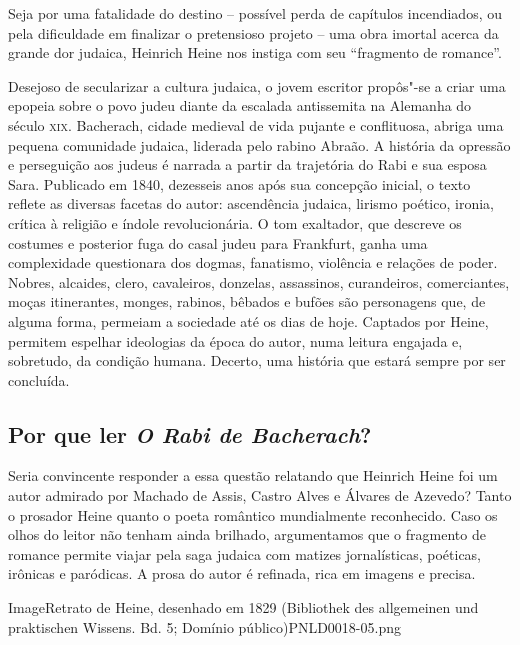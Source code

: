 \documentclass[12pt]{extarticle}
\begin{document}
Seja por uma fatalidade do destino -- possível perda de capítulos
incendiados, ou pela dificuldade em finalizar o pretensioso projeto --
uma obra imortal acerca da grande dor judaica, Heinrich Heine nos
instiga com seu ``fragmento de romance''. 


Desejoso de secularizar a cultura judaica, o jovem escritor propôs"-se a criar uma epopeia sobre o
povo judeu diante da escalada antissemita na Alemanha do século \textsc{xix}.
Bacherach, cidade medieval de vida pujante e conflituosa, abriga uma
pequena comunidade judaica, liderada pelo rabino Abraão. A história da
opressão e perseguição aos judeus é narrada a partir da trajetória do
Rabi e sua esposa Sara. Publicado em 1840, dezesseis anos após sua
concepção inicial, o texto reflete as diversas facetas do autor:
ascendência judaica, lirismo poético, ironia, crítica à religião e
índole revolucionária. O tom exaltador, que descreve os costumes e
posterior fuga do casal judeu para Frankfurt, ganha uma complexidade
questionara dos dogmas, fanatismo, violência e relações de poder.
Nobres, alcaides, clero, cavaleiros, donzelas, assassinos, curandeiros,
comerciantes, moças itinerantes, monges, rabinos, bêbados e bufões são
personagens que, de alguma forma, permeiam a sociedade até os dias de
hoje. Captados por Heine, permitem espelhar ideologias da época do
autor, numa leitura engajada e, sobretudo, da condição humana. Decerto,
uma história que estará sempre por ser concluída.

\subsection{Por que ler \textit{O Rabi de Bacherach}?}

Seria convincente responder a essa questão relatando que Heinrich Heine
foi um autor admirado por Machado de Assis, Castro Alves e Álvares de
Azevedo? Tanto o prosador Heine quanto o poeta romântico mundialmente
reconhecido. Caso os olhos do leitor não tenham ainda brilhado,
argumentamos que o fragmento de romance permite viajar pela saga judaica
com matizes jornalísticas, poéticas, irônicas e paródicas. A prosa do
autor é refinada, rica em imagens e precisa.


Image{Retrato de Heine, desenhado em 1829 (Bibliothek des allgemeinen und praktischen Wissens. Bd. 5; Domínio público)}{PNLD0018-05.png}
\end{document}
